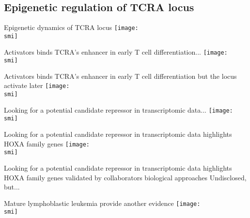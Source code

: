 \documentclass[10pt]{beamer}
\def\smi{out/ln/updir/mw-gcthesis-oral/library.bib}
\begin{document}
\subsection{Epigenetic regulation of TCRA locus}
\begin{frame}{Epigenetic dynamics of TCRA locus}
  \def\smi{out/ln/updir/mw-gcthesis-oral/ink/chromatin-states/genome-view/tcra.pdf}
  \texttt{[image: \\smi]}
\end{frame}
\begin{frame}{Activators binds TCRA's enhancer in early T cell differentiation...}
  \def\smi{out/ln/updir/mw-gcthesis-oral/ink/ea-tf-mouse.pdf}
  \texttt{[image: \\smi]}%
\end{frame}
\begin{frame}{Activators binds TCRA's enhancer in early T cell differentiation but the locus activate later}
  \def\smi{out/ln/updir/mw-gcthesis-oral/ink/ea-tf-mouse.pdf}
  \texttt{[image: \\smi]}%
\end{frame}
\begin{frame}{Looking for a potential candidate repressor in transcriptomic data...}
  \def\smi{out/ln/updir/mw-gcthesis-oral/ink/rna-clusters/all.pdf}
  \texttt{[image: \\smi]}
\end{frame}
\begin{frame}{Looking for a potential candidate repressor in transcriptomic data highlights HOXA family genes}
  \def\smi{out/ln/updir/mw-gcthesis-oral/ink/rna-clusters/c13-tf.pdf}
  \texttt{[image: \\smi]}
\end{frame}
\begin{frame}{Looking for a potential candidate repressor in transcriptomic data highlights HOXA family genes validated by collaborators biological approaches}
  Undisclosed, but...
\end{frame}
\begin{frame}{Mature lymphoblastic leukemia provide another evidence}
  \def\smi{out/ln/updir/mw-gcthesis-oral/ink/tall/H3K27ac_HOXA5-9_TLX1_TLX3_ealpha_barplot.png}
  \texttt{[image: \\smi]}%
\end{frame}
\end{document}
